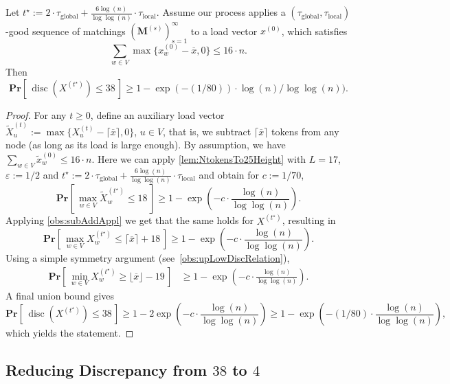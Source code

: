 \documentclass[twoside,leqno]{article}
\newcommand{\Pro}[1]{\mathbf{Pr} \left[\,#1\,\right]}
\newcommand{\M}{\mathbf{M}}
\DeclareMathOperator{\discr}{\mathrm{disc}}
\DeclareMathOperator{\1}{\mathbf{1}}
\newcommand{\taulocal}{\tau_{\mathrm{local}}}
\newcommand{\tauglobal}{\tau_{\mathrm{global}}}
\numberwithin{equation}{section}
\let\epsilon\varepsilon
\newcommand{\newL}{L}
\begin{document}
\begin{lemma}\label{lem:discrepancy-38}
Let $t^{\star}:= 2 \cdot \tauglobal+ \frac{6\log(n)}{\log\log(n)} \cdot \taulocal$.
Assume our process applies a $(\tauglobal,\taulocal)$-good sequence of matchings $\left(\M^{(s)}\right)_{s=1}^{\infty}$ to a load vector $x^{(0)}$, which satisfies 
\[
 \sum_{w \in V} \max\{ x_w^{(0)} - \overline{x}, 0 \} \leq 16 \cdot n.
\]
Then
\[
\Pro{ \discr(X^{(t^{\star})}) \leq 38 } \geq 1 - \exp(- (1/80)) \cdot \log(n) / \log \log(n)).
\]
\end{lemma}
\begin{proof}
    For any $t \geq 0$, define an auxiliary load vector $\widetilde{X}_u^{(t)} := \max\{ X_u^{(t)} - \lceil \overline{x} \rceil,0 \}$, $u \in V$, that is, we subtract $\lceil \overline{x} \rceil$ tokens from any node (as long as its load is large enough).
By assumption, we have $\sum_{w \in V} \widetilde{x}^{(0)}_w \le 16   \cdot n$. Here we can apply \cref{lem:NtokensTo25Height} with $\newL=17$, $\epsilon:=1/2$ and $t^{\star}:=2\cdot \tauglobal+ \frac{6\log(n)}{\log\log(n)} \cdot \taulocal$ and obtain for $c:=1/70$,
\[
\Pro{ \max_{w \in V} \widetilde{X}_w^{(t^{\star})} \leq 18} \geq 1 - \exp \left( - c \cdot \frac{\log(n)}{\log \log(n)} \right).
\]
Applying \cref{obs:subAddAppl} we get that the same holds for $X^{(t^{\star})}$, resulting in
\[
\Pro{ \max_{w \in V} X_w^{(t^{\star})} \leq \lceil \overline{x} \rceil + 18}
\geq 1 - \exp \left( - c \cdot \frac{\log(n)}{\log \log(n)} \right).
\]
Using a simple symmetry argument (see~\cref{obs:upLowDiscRelation}),
\begin{align*}
\Pro{ \min_{w \in V} X_w^{(t^{\star})} \geq \lfloor \overline{x} \rfloor - 19 } &\geq 1 - \exp \left( - c \cdot \frac{\log(n)}{\log \log(n)} \right).
\end{align*}
A final union bound gives
\[
\Pro{ \discr \left( X^{(t^{\star})} \right) \leq 38
} \geq 1 - 2 \exp \left( - c \cdot \frac{\log(n)}{\log \log(n)} \right) \geq 1 - \exp\left( -(1/80) \cdot \frac{\log(n)}{\log \log(n)} \right),
\]
which yields the statement.
\end{proof}














\subsection{Reducing Discrepancy from $38$ to $4$}
\end{document}

